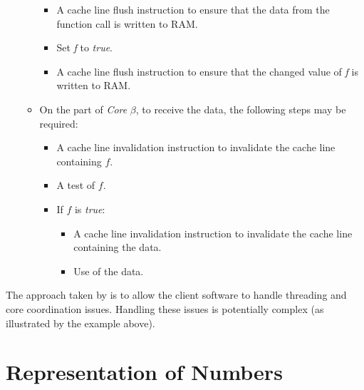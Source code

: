 \begin{itemize}
\begin{itemize}
\begin{itemize}
            \item A cache line flush instruction to ensure
                  that the data
                  from the function
                  call is written to RAM.
            \item Set \emph{f} to \emph{true}.
            \item A cache line flush instruction to ensure
                  that the changed value of
                  \emph{f} is written to RAM.
            \end{itemize}
      \item On the part of \emph{Core} $\beta$, to receive
            the data,
            the following steps may be required:
            \begin{itemize}
            \item A cache line invalidation instruction to
                  invalidate the
                  cache line containing $f$.
            \item A test of $f$.
            \item If $f$ is \emph{true}:
                  \begin{itemize}
                  \item A cache line invalidation
                        instruction to invalidate
                        the cache line containing the data.
                  \item Use of the data.
                  \end{itemize}
            \end{itemize}
      \end{itemize}
\end{itemize}

The approach taken by \emph{\productbasenameshort{}} is to 
allow the client software to handle threading and core 
coordination issues.  Handling these issues is potentially 
complex (as illustrated by the example above).  


\section{Representation of Numbers}
\label{cldd0:srnm0}


